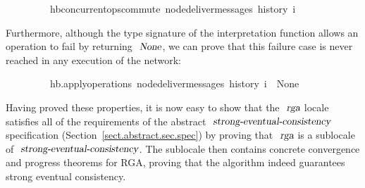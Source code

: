 \begin{isabellebody}
\ \ \ \ \ \ \ \ \ {\isachardoublequoteopen}hb{\isachardot}concurrent{\isacharunderscore}ops{\isacharunderscore}commute\ {\isacharparenleft}node{\isacharunderscore}deliver{\isacharunderscore}messages\ {\isacharparenleft}history\ i{\isacharparenright}{\isacharparenright}{\isachardoublequoteclose}
\end{isabellebody}
\vspace{0.35em}
Furthermore, although the type signature of the interpretation function allows an operation to fail by returning $\isa{None}$, we can prove that this failure case is never reached in any execution of the network:
\vspace{0.35em}
\begin{isabellebody}
\ \ \ \ \ \ \ \ \ {\isachardoublequoteopen}hb.apply{\isacharunderscore}operations\ {\isacharparenleft}node{\isacharunderscore}deliver{\isacharunderscore}messages\ {\isacharparenleft}history\ i{\isacharparenright}{\isacharparenright}\ {\isasymnoteq}\ None{\isachardoublequoteclose}
\end{isabellebody}
\vspace{0.35em}
Having proved these properties, it is now easy to show that the $\isa{rga}$ locale satisfies all of the requirements of the abstract $\isa{strong-eventual-consistency}$ specification (Section~\ref{sect.abstract.sec.spec}) by proving that $\isa{rga}$ is a sublocale of $\isa{strong-eventual-consistency}$.
The sublocale then contains concrete convergence and progress theorems for RGA, proving that the algorithm indeed guarantees strong eventual consistency.
